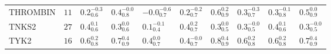 \begin{tabular}{llllllllll}
THROMBIN    &   $11$ &  $0.2^{-0.3}_{0.6}$ &   $0.4^{-0.0}_{0.8}$ &  $-0.0^{-0.6}_{0.7}$ &  $0.2^{-0.2}_{0.7}$ &   $0.6^{0.2}_{0.9}$ &  $0.3^{-0.3}_{0.7}$ &    $0.3^{-0.1}_{0.8}$ &   $0.5^{0.0}_{0.9}$ \\
TNKS2       &   $27$ &   $0.4^{0.1}_{0.6}$ &    $0.3^{0.0}_{0.6}$ &   $0.1^{-0.1}_{0.4}$ &   $0.4^{0.2}_{0.7}$ &   $0.3^{0.0}_{0.5}$ &  $0.3^{-0.0}_{0.5}$ &     $0.4^{0.1}_{0.6}$ &  $0.3^{-0.0}_{0.5}$ \\
TYK2        &   $16$ &   $0.6^{0.2}_{0.8}$ &    $0.7^{0.4}_{0.9}$ &    $0.4^{0.0}_{0.7}$ &  $0.4^{-0.0}_{0.7}$ &   $0.8^{0.4}_{0.9}$ &   $0.6^{0.2}_{0.8}$ &     $0.6^{0.2}_{0.8}$ &   $0.7^{0.4}_{0.9}$ \\
\bottomrule
\end{tabular}
